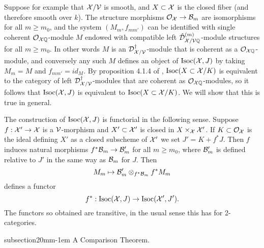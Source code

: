 \documentclass{article}
\makeatletter
\theoremstyle{change}
\renewcommand{\subsection}{\@startsection%
{subsection}{2}{0mm}{\baselineskip}{-1em}%
{\normalfont\normalsize\bfseries}}
\numberwithin{equation}{subsubsection}
\makeatother
\begin{document}
Suppose for example that ${\cal X}/{\cal V}$ is smooth, and $X\subset{\cal X}$ is the
closed fiber (and therefore smooth over $k$). The structure morphisms
${\cal O}_{\cal X}\to{\cal B}_m$ are isomorphisms for all $m\ge m_0$, and the system
$(M_m,f_{mm'})$ can be identified with single coherent
${\cal O}_{{\cal X}{\mathbb Q}}$-module $M$ endowed with compatible left
${\hat{\cal D}}^{({m})}_{{\cal X}/{\cal V}{\mathbb Q}}$-module structures for all $m\ge m_0$. In
other words $M$ is an ${\cal D}^\dagger_{{\cal X}/{\cal V}}$-module that is coherent as a
${\cal O}_{{\cal X}{\mathbb Q}}$-module, and conversely any such $M$ defines an object of
$\mathrm{Isoc}({\cal X},J)$ by taking $M_m=M$ and $f_{mm'}=id_M$. By proposition
4.1.4 of \cite{berthelot:1996}, $\mathrm{Isoc}(X\subset{\cal X}/K)$ is equivalent
to the category of left ${\cal D}^\dagger_{{\cal X}/{\cal V}}$-modules that are coherent as
${\cal O}_{{\cal X}{\mathbb Q}}$-modules, so it follows that $\mathrm{Isoc}({\cal X},J)$ is equivalent
to $\mathrm{Isoc}(X\subset{\cal X}/K)$. We will show that this is true in general.

The construction of $\mathrm{Isoc}({\cal X},J)$ is functorial in the following
sense. Suppose $f:{\cal X}'\to{\cal X}$ is a ${\cal V}$-morphism and $X'\subset{\cal X}'$
is closed in $X\times_{\cal X}{\cal X}'$. If $K\subset{\cal O}_{\cal X}$ is the ideal
defining $X'$ as a closed subscheme of ${\cal X}'$ we set $J'=K+f^*J$. Then
$f$ induces natural morphisms $f^*{\cal B}_m\to{\cal B}'_m$ for all $m\ge m_0$,
where ${\cal B}'_m$ is defined relative to $J'$ in the same way as ${\cal B}_m$
for $J$. Then
\begin{displaymath}
  M_m\mapsto{\cal B}'_m\otimes_{f^*{\cal B}_m}f^*M_m
\end{displaymath}
defines a functor
\begin{equation}
  \label{eq:base-change-of-Isoc}
  f^*:\mathrm{Isoc}({\cal X},J)\to\mathrm{Isoc}({\cal X}',J').
\end{equation}
The functors so obtained are transitive, in the usual sense this has
for 2-categories.

\subsection{A Comparison Theorem. }
\label{sec:formal-analytic-comparison}
\end{document}
